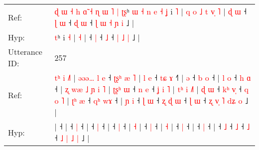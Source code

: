 \documentclass[10pt]{article}
\DeclareRobustCommand{\hl}[1]{{\textcolor{red}{#1}}}
\begin{document}
\begin{longtable}{ll}
Ref: & \hl{ɖ}\hl{ }\hl{ɯ}\hl{ }\hl{˧}\hl{ }\hl{h}\hl{ }\hl{ɑ}\hl{̃}\hl{ }\hl{˧}\hl{ }\hl{ɳ}\hl{ }\hl{ɯ}\hl{ }\hl{˥}\hl{ }\hl{|}\hl{ }\hl{ʈ}\hl{ʂ}ʰ\hl{ }\hl{ɯ}\hl{ }\hl{˧}\hl{ }\hl{n}\hl{ }\hl{e}\hl{ }\hl{˧}\hl{ }\hl{ʝ} i \hl{˥} |\hl{ }\hl{q}\hl{ }\hl{o}\hl{ }\hl{˩}\hl{ }\hl{t}\hl{ }\hl{v}\hl{̩} \hl{˥} |\hl{ }\hl{ɖ}\hl{ }\hl{ɯ} ˧\hl{ }\hl{ɭ} \hl{ɯ} ˧\hl{ }\hl{ɖ} \hl{ɯ} ˧\hl{ }\hl{ɭ}\hl{ }\hl{ɯ} \hl{˧} \hl{ɲ} \hl{i} ˩ |
 \\
Hyp: & \hl{}\hl{}\hl{}\hl{}\hl{}\hl{}\hl{}\hl{}\hl{}\hl{}\hl{}\hl{}\hl{}\hl{}\hl{}\hl{}\hl{}\hl{}\hl{}\hl{}\hl{}\hl{}\hl{t}ʰ\hl{}\hl{}\hl{}\hl{}\hl{}\hl{}\hl{}\hl{}\hl{}\hl{}\hl{}\hl{} i \hl{˧} |\hl{}\hl{}\hl{}\hl{}\hl{}\hl{}\hl{}\hl{}\hl{}\hl{}\hl{} \hl{˧} |\hl{}\hl{}\hl{}\hl{} ˧\hl{}\hl{} \hl{|} ˧\hl{}\hl{} \hl{˩} ˧\hl{}\hl{}\hl{}\hl{} \hl{|} \hl{˩} \hl{|} ˩ |
 \\
\midrule
Utterance ID: & 257 \\
Ref: & \hl{t}\hl{ʰ}\hl{ }\hl{i}\hl{ }\hl{˩}\hl{˥}\hl{ }|\hl{ }\hl{ə}\hl{ə}\hl{ə}\hl{…}\hl{ }\hl{l}\hl{ }\hl{e} ˧\hl{ }\hl{ʈ}\hl{ʂ}\hl{ʰ}\hl{ }\hl{æ}\hl{ }\hl{˥} |\hl{ }\hl{l}\hl{ }\hl{e} ˧\hl{ }\hl{t}\hl{ɕ} \hl{ɤ} ˧\hl{˥} |\hl{ }\hl{ə} ˧\hl{ }\hl{b} \hl{o} ˧ |\hl{ }\hl{l}\hl{ }\hl{o} ˧\hl{ }\hl{h} \hl{ɑ} ˧ |\hl{ }\hl{ʐ}\hl{ }\hl{w}\hl{æ}\hl{ }\hl{˩}\hl{ }\hl{ɲ}\hl{ }\hl{i} \hl{˥} |\hl{ }\hl{ʈ}\hl{ʂ}\hl{ʰ}\hl{ }\hl{ɯ} ˧\hl{ }\hl{n} \hl{e} ˧\hl{ }\hl{ʝ}\hl{ }\hl{i}\hl{ }\hl{˥} |\hl{ }\hl{t}\hl{ʰ}\hl{ }\hl{i} \hl{˩}\hl{˥} |\hl{ }\hl{ɖ}\hl{ }\hl{ɯ} ˧\hl{ }\hl{k}\hl{ʰ} \hl{v}\hl{̩} ˧\hl{ }\hl{q}\hl{ }\hl{o}\hl{ }\hl{˥} |\hl{ }\hl{ʈ}\hl{ʰ}\hl{ }\hl{æ} ˧\hl{ }\hl{q}\hl{ʰ} \hl{w}\hl{ɤ} ˧ |\hl{ }\hl{ɲ}\hl{ }\hl{i} ˧\hl{ }\hl{ɭ} \hl{ɯ} ˧\hl{ }\hl{ʐ}\hl{ }\hl{ɖ} \hl{ɯ} ˧\hl{ }\hl{ɭ} \hl{ɯ} ˧\hl{ }\hl{ʐ} \hl{v}\hl{̩} \hl{˥} \hl{d}\hl{ʑ} \hl{o} ˩ |
 \\
Hyp: & \hl{}\hl{}\hl{}\hl{}\hl{}\hl{}\hl{}\hl{}|\hl{}\hl{}\hl{}\hl{}\hl{}\hl{}\hl{}\hl{}\hl{} ˧\hl{}\hl{}\hl{}\hl{}\hl{}\hl{}\hl{}\hl{} |\hl{}\hl{}\hl{}\hl{} ˧\hl{}\hl{}\hl{} \hl{|} ˧\hl{} |\hl{}\hl{} ˧\hl{}\hl{} \hl{|} ˧ |\hl{}\hl{}\hl{}\hl{} ˧\hl{}\hl{} \hl{|} ˧ |\hl{}\hl{}\hl{}\hl{}\hl{}\hl{}\hl{}\hl{}\hl{}\hl{}\hl{} \hl{˧} |\hl{}\hl{}\hl{}\hl{}\hl{}\hl{} ˧\hl{}\hl{} \hl{|} ˧\hl{}\hl{}\hl{}\hl{}\hl{}\hl{} |\hl{}\hl{}\hl{}\hl{}\hl{} \hl{}\hl{˧} |\hl{}\hl{}\hl{}\hl{} ˧\hl{}\hl{}\hl{} \hl{}\hl{|} ˧\hl{}\hl{}\hl{}\hl{}\hl{}\hl{} |\hl{}\hl{}\hl{}\hl{}\hl{} ˧\hl{}\hl{}\hl{} \hl{}\hl{|} ˧ |\hl{}\hl{}\hl{}\hl{} ˧\hl{}\hl{} \hl{˩} ˧\hl{}\hl{}\hl{}\hl{} \hl{˩} ˧\hl{}\hl{} \hl{˩} ˧\hl{}\hl{} \hl{}\hl{˩} \hl{|} \hl{}\hl{˩} \hl{|} ˩ |
 \\

\end{longtable}
\end{document}
